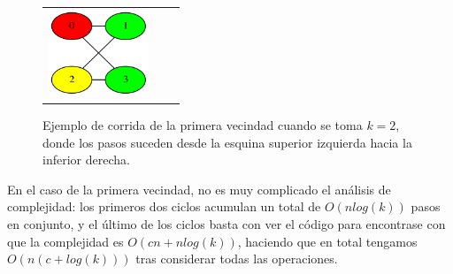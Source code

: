 \documentclass{article}
\theoremstyle{definition}
\theoremstyle{remark}
\begin{document}
\begin{figure}
\begin{minipage}{0.70\textwidth}
\begin{tabular}{ccc}
            \includegraphics[width=3cm]{examples/4/1/example4_1_5.png}
        \end{tabular}
    \end{minipage}
    \caption{Ejemplo de corrida de la primera vecindad cuando se toma $k=2$, donde los pasos suceden desde la esquina superior izquierda hacia la inferior derecha. \label{grf:ex4-example-1}}
\end{figure}

En el caso de la primera vecindad, no es muy complicado el análisis de complejidad: los primeros dos ciclos acumulan un total de $O(n log(k))$ pasos en conjunto, y el último de los ciclos basta con ver el código para encontrase con que la complejidad es $O(cn + nlog(k))$, haciendo que en total tengamos $O(n(c + log(k)))$ tras considerar todas las operaciones.
\end{document}
